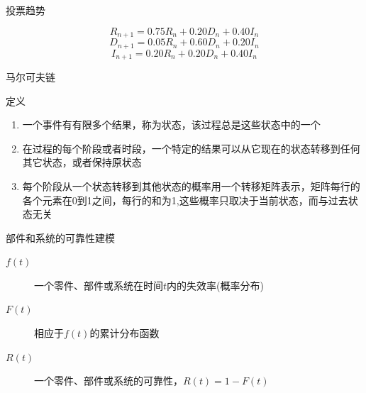 \documentclass[UTF8]{ctexbeamer}
\begin{document}
\begin{frame}{投票趋势}
  \begin{figure}
    \centering
    \setcounter{subfigure}{0}{}
  \end{figure}
  \[
  R_{n+1}=0.75R_n+0.20D_n+0.40I_n
  \]
  \[
  D_{n+1}=0.05R_n+0.60D_n+0.20I_n
  \]
  \[
  I_{n+1}=0.20R_n+0.20D_n+0.40I_n
  \]

\end{frame}

\begin{frame}{马尔可夫链}

  \begin{block}{定义}
    \begin{enumerate}
    \item 一个事件有有限多个结果，称为状态，该过程总是这些状态中的一个
    \item 在过程的每个阶段或者时段，一个特定的结果可以从它现在的状态转移到任何其它状态，或者保持原状态
    \item 每个阶段从一个状态转移到其他状态的概率用一个转移矩阵表示，矩阵每行的各个元素在0到1之间，每行的和为1,这些概率只取决于当前状态，而与过去状态无关
    \end{enumerate}
  \end{block}
  
\end{frame}

\begin{frame}{部件和系统的可靠性建模}

  \begin{description}
  \item[$f(t)$] 一个零件、部件或系统在时间$t$内的失效率(概率分布)
  \item[$F(t)$] 相应于$f(t)$的累计分布函数
  \item[$R(t)$] 一个零件、部件或系统的可靠性，$R(t)=1-F(t)$
  \end{description}
  
\end{frame}
\end{document}

